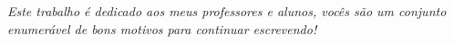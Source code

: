 \begingroup
\thispagestyle{empty}

\vspace*{\fill}
\centering
\noindent
\textit{Este trabalho é dedicado aos meus professores e alunos, vocês são um conjunto enumerável de bons motivos para continuar escrevendo!} 
\vspace*{\fill}

\endgroup
\newpage